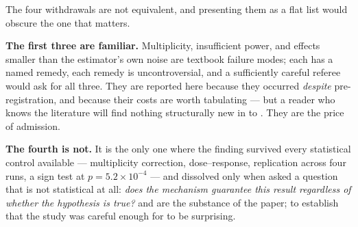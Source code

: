 The four withdrawals are not equivalent, and presenting them as a flat list would obscure the
one that matters.

\textbf{The first three are familiar.} Multiplicity, insufficient power, and effects smaller than the
estimator's own noise are textbook failure modes; each has a named remedy, each remedy is
uncontroversial, and a sufficiently careful referee would ask for all three. They are reported
here because they occurred \emph{despite} pre-registration, and because their costs are worth
tabulating --- but a reader who knows the literature will find nothing structurally new in 
to . They are the price of admission.

\textbf{The fourth is not.} It is the only one where the finding survived every statistical control
available --- multiplicity correction, dose--response, replication across four runs, a sign test at
\(p = 5.2 \times 10^{-4}\) --- and dissolved only when asked a question that is not statistical at all: \emph{does the
mechanism guarantee this result regardless of whether the hypothesis is true?}  and  are
the substance of the paper;  to  establish that the study was careful enough for  to
be surprising.
